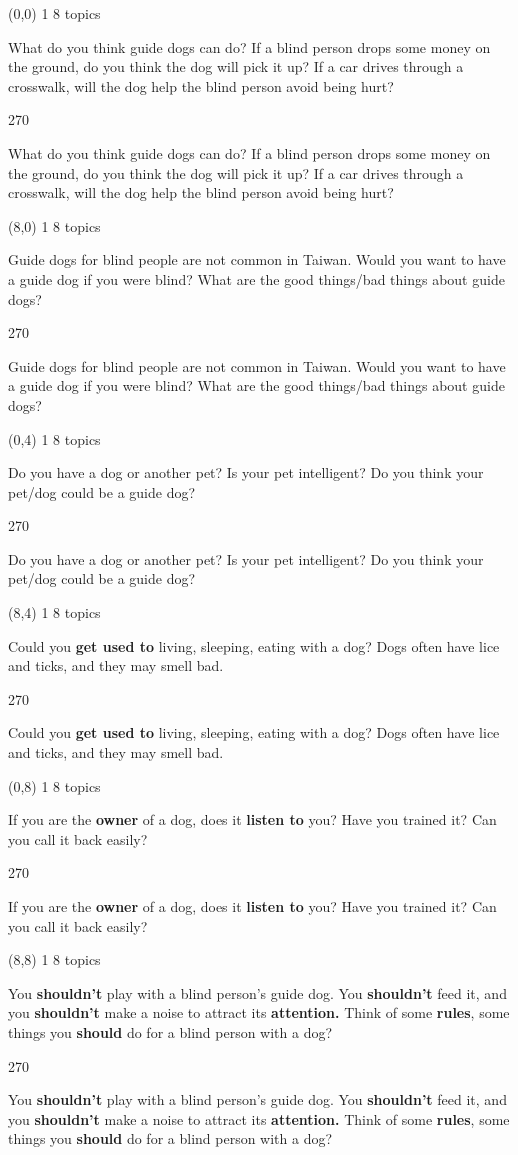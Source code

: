 \documentclass[a4paper]{article}
\newenvironment{itemize*}%
{\begin{itemize}%
 \setlength{\itemsep}{0.5cm}%
 \setlength{\parsep}{0pt}%
 \setlength{\parskip}{0pt}}%
{\end{itemize}}
\newcommand{\mycard}[3]{%
	\small #1 #2
	\par
	\parbox[t][6.8cm][c]{9.5cm}{%
	\par
	\myleft{#3}
	\par
	\myright{#3}
	}
}
\newcommand{\myleft}[1]{%
	\begin{sideways}
	\hspace*{-0.9cm}
		\parbox[t][2.7cm][t]{6.5cm}{%
		\large #1
		}
	\end{sideways}
}
\newcommand{\myright}[1]{%
	\hspace*{6.5cm}
	\begin{turn}{270}
	\hspace*{-7.1cm}
		\parbox[t][2.7cm][t]{6.5cm}{%
		\large #1
		}
	\end{turn}
}
\begin{document}
\begin{textblock}{8}(0,0)
\mycard{1}{8 topics}{
\begin{itemize*}
\item What do you think guide dogs can do? If a blind person drops some money on the ground, do you think the dog will pick it up? If a car drives through a crosswalk, will the dog help the blind person avoid being hurt?
\end{itemize*}
}
\end{textblock}

\begin{textblock}{8}(8,0)
\mycard{1}{8 topics}{
\begin{itemize*}
\item Guide dogs for blind people are not common in Taiwan. Would you want to have a guide dog if you were blind? What are the good things/bad things about guide dogs?
\end{itemize*}
}
\end{textblock}

\begin{textblock}{8}(0,4)
\mycard{1}{8 topics}{
\begin{itemize*}
\item Do you have a dog or another pet? Is your pet intelligent? Do you think your pet/dog could be a guide dog?
\end{itemize*}
}
\end{textblock}

\begin{textblock}{8}(8,4)
\mycard{1}{8 topics}{
\begin{itemize*}
\item Could you \textbf{get used to} living, sleeping, eating with a dog? Dogs often have lice and ticks, and they may smell bad.
\end{itemize*}
}
\end{textblock}

\begin{textblock}{8}(0,8)
\mycard{1}{8 topics}{
\begin{itemize*}
\item If you are the \textbf{owner} of a dog, does it \textbf{listen to} you? Have you trained it? Can you call it back easily?
\end{itemize*}
}
\end{textblock}

\begin{textblock}{8}(8,8)
\mycard{1}{8 topics}{
\begin{itemize*}
\item You \textbf{shouldn't} play with a blind person's guide dog. You \textbf{shouldn't} feed it, and you \textbf{shouldn't} make a noise to attract its \textbf{attention.} Think of some \textbf{rules}, some things you \textbf{should} do for a blind person with a dog?
\end{itemize*}
}
\end{textblock}
\end{document}
